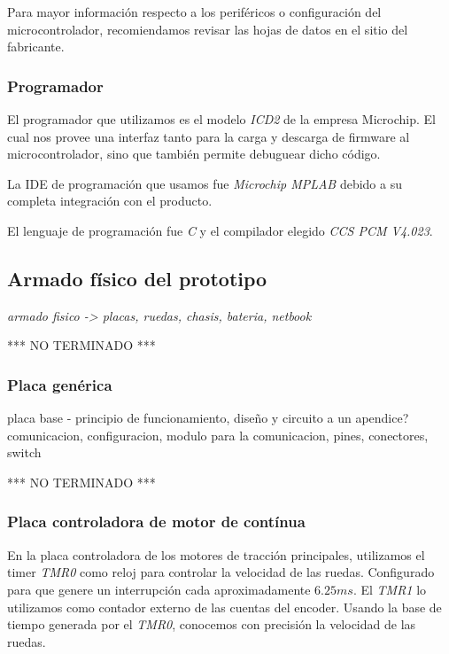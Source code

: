 Para mayor informaci\'on respecto a los perif\'ericos o configuraci\'on del microcontrolador, recomiendamos revisar las hojas de datos en el sitio del fabricante.

\subsubsection{Programador}
\label{HMprogramador}

El programador que utilizamos es el modelo \emph{ICD2} de la empresa Microchip. El cual nos provee una interfaz tanto para la carga y descarga
de firmware al microcontrolador, sino que tambi\'en permite debuguear dicho c\'odigo.

La IDE de programaci\'on que usamos fue \emph{Microchip MPLAB} debido a su completa integraci\'on con el producto.

El lenguaje de programaci\'on fue \emph{C} y el compilador elegido \emph{CCS PCM V4.023}.

\subsection{Armado f\'isico del prototipo}
\label{Harmado}

\emph{armado fisico -> placas, ruedas, chasis, bateria, netbook}




*** NO TERMINADO ***




\subsubsection{Placa gen\'erica}
\label{HAPgenerica}

placa base - principio de funcionamiento, diseño y circuito a un apendice?
comunicacion, configuracion, modulo para la comunicacion, pines, conectores, switch




*** NO TERMINADO ***





\subsubsection{Placa controladora de motor de cont\'inua}
\label{HAPmotorDC}

En la placa controladora de los motores de tracci\'on principales, utilizamos el timer \emph{TMR0} como reloj para controlar la
velocidad de las ruedas. Configurado para que genere un interrupci\'on cada aproximadamente $6.25 ms$. El \emph{TMR1} lo utilizamos como
contador externo de las cuentas del encoder. Usando la base de tiempo generada por el \emph{TMR0}, conocemos con precisi\'on la velocidad
de las ruedas.


